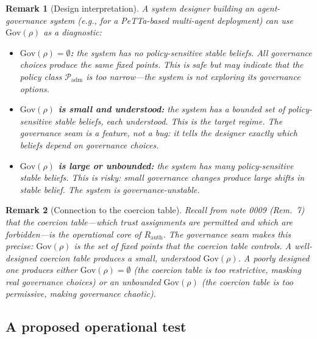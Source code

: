 \documentclass[11pt]{article}
\newtheorem{remark}{Remark}
\newcommand{\Gov}{\mathrm{Gov}}
\newcommand{\Padm}{\mathcal{P}_{\mathrm{adm}}}
\newcommand{\Rauth}{R_{\mathrm{auth}}}
\begin{document}
\begin{remark}[Design interpretation]
A system designer building an agent-governance system (e.g., for a PeTTa-based multi-agent
deployment) can use $\Gov(\rho)$ as a diagnostic:
\begin{itemize}
  \item \textbf{$\Gov(\rho) = \emptyset$:} the system has no policy-sensitive stable beliefs.
        All governance choices produce the same fixed points. This is safe but may indicate
        that the policy class $\Padm$ is too narrow---the system is not exploring its
        governance options.
  \item \textbf{$\Gov(\rho)$ is small and understood:} the system has a bounded set of
        policy-sensitive stable beliefs, each understood. This is the target regime. The
        governance seam is a feature, not a bug: it tells the designer exactly which beliefs
        depend on governance choices.
  \item \textbf{$\Gov(\rho)$ is large or unbounded:} the system has many policy-sensitive
        stable beliefs. This is risky: small governance changes produce large shifts in
        stable belief. The system is governance-unstable.
\end{itemize}
\end{remark}

\begin{remark}[Connection to the coercion table]
Recall from note 0009 (Rem.~7) that the coercion table---which trust assignments are
permitted and which are forbidden---is the operational core of $\Rauth$. The governance seam
makes this precise: $\Gov(\rho)$ is the set of fixed points that the coercion table
\emph{controls}. A well-designed coercion table produces a small, understood $\Gov(\rho)$.
A poorly designed one produces either $\Gov(\rho) = \emptyset$ (the coercion table is too
restrictive, masking real governance choices) or an unbounded $\Gov(\rho)$ (the coercion
table is too permissive, making governance chaotic).
\end{remark}

\subsection{A proposed operational test}
\end{document}
